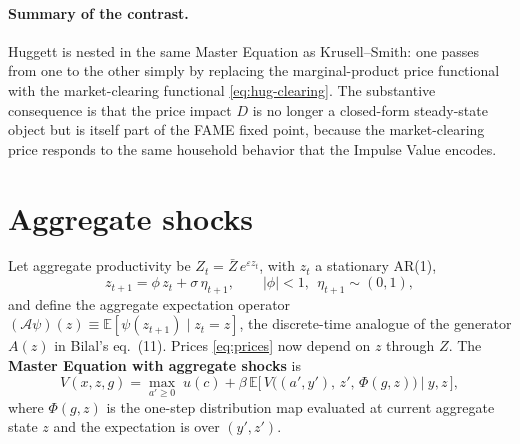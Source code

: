 \documentclass[11pt]{article}
\newcommand{\E}{\mathbb{E}}
\newcommand{\Aop}{\mathcal{A}}
\begin{document}
\paragraph{Summary of the contrast.} Huggett is nested in the same Master Equation as
Krusell--Smith: one passes from one to the other simply by replacing the
marginal-product price functional with the market-clearing functional
\eqref{eq:hug-clearing}. The substantive consequence is that the price impact
$D$ is no longer a closed-form steady-state object but is itself part of the FAME fixed
point, because the market-clearing price responds to the same household behavior that
the Impulse Value encodes.

\section{Aggregate shocks}

Let aggregate productivity be $Z_t=\bar Z\,e^{\varepsilon z_t}$, with $z_t$ a
stationary AR(1),
\[
  z_{t+1}=\phi\,z_t+\sigma\,\eta_{t+1},\qquad |\phi|<1,\ \ \eta_{t+1}\sim(0,1),
\]
and define the aggregate expectation operator
$(\Aop\psi)(z)\equiv\E[\psi(z_{t+1})\mid z_t=z]$, the discrete-time analogue of the
generator $A(z)$ in Bilal's eq.~(11). Prices \eqref{eq:prices} now depend on $z$
through $Z$. The \textbf{Master Equation with aggregate shocks} is
\begin{equation}\label{eq:master-agg}
  V(x,z,g)=\max_{a'\ge0}\;
  u(c)
  +\beta\,\E\Big[\,V\big((a',y'),\,z',\,\Phi(g,z)\big)\ \big|\ y,z\,\Big],
\end{equation}
where $\Phi(g,z)$ is the one-step distribution map evaluated at current aggregate
state $z$ and the expectation is over $(y',z')$.
\end{document}
